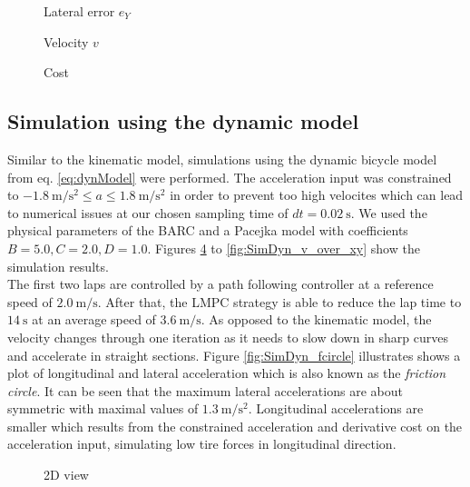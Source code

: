 \begin{figure}[ht]
	\centering
  	
  	\caption{Lateral error $e_Y$}
	\label{fig:SimKin_eY}
\end{figure}

\begin{figure}[ht]
	\centering
  	
  	\caption{Velocity $v$}
	\label{fig:SimKin_v}
\end{figure}

\begin{figure}[ht]
	\centering
  	
  	\caption{Cost}
	\label{fig:SimKin_cost}
\end{figure}
\subsection{Simulation using the dynamic model}
Similar to the kinematic model, simulations using the dynamic bicycle model from eq. \ref{eq:dynModel} were performed. The acceleration input was constrained to $-\SI{1.8}{\meter\per\square\second}\leq a \leq \SI{1.8}{\meter\per\square\second}$ in order to prevent too high velocites which can lead to numerical issues at our chosen sampling time of $dt=\SI{0.02}{\second}$. We used the physical parameters of the BARC and a Pacejka model with coefficients $B=5.0, C=2.0, D = 1.0$. Figures \ref{fig:SimDyn_xy} to \ref{fig:SimDyn_v_over_xy} show the simulation results.\\
The first two laps are controlled by a path following controller at a reference speed of $\SI{2.0}{\meter\per\second}$. After that, the LMPC strategy is able to reduce the lap time to $\SI{14}{\second}$ at an average speed of $\SI{3.6}{\meter\per\second}$.
As opposed to the kinematic model, the velocity changes through one iteration as it needs to slow down in sharp curves and accelerate in straight sections.
Figure \ref{fig:SimDyn_fcircle} illustrates shows a plot of longitudinal and lateral acceleration which is also known as the \emph{friction circle}. It can be seen that the maximum lateral accelerations are about symmetric with maximal values of $\SI{1.3}{\meter\per\square\second}$. Longitudinal accelerations are smaller which results from the constrained acceleration and derivative cost on the acceleration input, simulating low tire forces in longitudinal direction.
\begin{figure}[ht]
	\centering
  	
	\caption{2D view}
	\label{fig:SimDyn_xy}
\end{figure}

